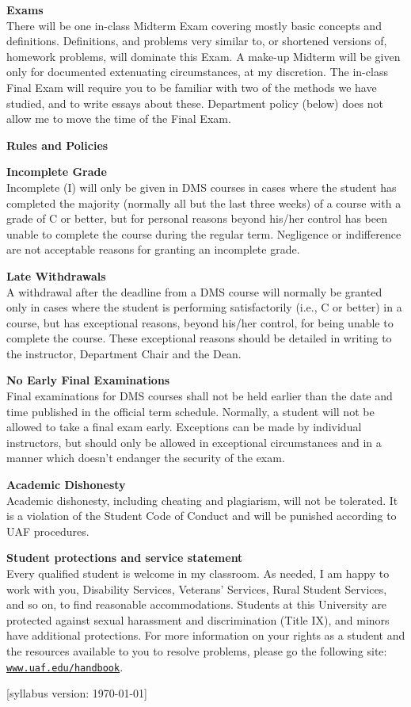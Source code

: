 \documentclass[12pt]{article}
\renewcommand{\emph}[1]{\textsf{\textbf{#1}}}
\newcommand{\localhead}[1]{\par\smallskip\textbf{#1} \smallskip\nobreak\\}%
\def\heading#1{\localhead{\large\emph{#1}}}
\def\subheading#1{\localhead{\emph{#1}}}
\begin{document}
\heading{Exams}
There will be one in-class Midterm Exam covering mostly basic concepts and definitions.  Definitions, and problems very similar to, or shortened versions of, homework problems, will dominate this Exam.  A make-up Midterm will be given only for documented extenuating circumstances, at my discretion.  The in-class Final Exam will require you to be familiar with two of the methods we have studied, and to write essays about these.  Department policy (below) does not allow me to move the time of the Final Exam.


\bigskip

\heading{Rules and Policies}
\vskip -20pt

\subheading{Incomplete Grade} 
Incomplete (I) will only be given in
  DMS courses in cases where
  the student has completed the majority (normally all but the last
  three weeks) of a course with a grade of C or better, but for
  personal reasons beyond his/her control has been unable to complete
  the course during the regular term. Negligence or indifference are
  not acceptable reasons for granting an incomplete grade.

\subheading{Late Withdrawals} 
A withdrawal after the deadline from a DMS course will
  normally be granted only in cases where the student is performing
  satisfactorily (i.e., C or better) in a course, but has exceptional
  reasons, beyond his/her control, for being unable to complete the
  course.  These exceptional reasons should be detailed in writing to
  the instructor, Department Chair and the Dean.

\clearpage\newpage
\subheading{No Early Final Examinations}
Final examinations for DMS courses shall not be held earlier than the date and time published in the official term schedule.  Normally, a student will not be allowed to take a final exam early.  Exceptions can be made by individual instructors, but should only be allowed in exceptional circumstances and in a manner which doesn't endanger the security of the exam.

\subheading{Academic Dishonesty}
Academic dishonesty, including cheating and plagiarism, will not be tolerated.  It is a violation of the Student Code of Conduct and will be punished according to UAF procedures.

\subheading{Student protections and service statement}
Every qualified student is welcome in my classroom.  As needed, I am happy to work with you, Disability Services, Veterans' Services, Rural Student Services, and so on, to find reasonable accommodations.  Students at this University are protected against sexual harassment and discrimination (Title IX), and minors have additional protections.  For more information on your rights as a student and the resources available to you to resolve problems, please go the following site: \href{https://www.uaf.edu/handbook/}{\texttt{www.uaf.edu/handbook}}.

\hfill  \scriptsize [syllabus version: \today] \normalsize
\end{document}
